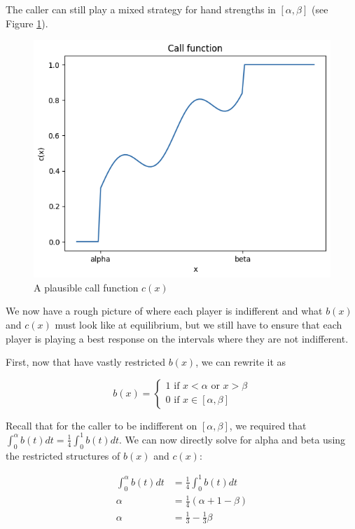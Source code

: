 \documentclass[a4paper,12pt]{article}
\begin{document}
The caller can still play a mixed strategy for hand strengths in $[ \alpha, \beta ]$ (see Figure \ref{call_function}). 

\begin{figure}
    \begin{center}
    \includegraphics*[scale=0.4]{../call_function.png}
    \caption{A plausible call function $c(x)$}
    \label{call_function}
    \end{center}
\end{figure}

We now have a rough picture of where each player is indifferent and what $b(x)$ and $c(x)$ must look like at equilibrium, but we still have to ensure that each player is playing a best response on the intervals where they are not indifferent. 

First, now that have vastly restricted $b(x)$, we can rewrite it as 

\[ b(x) = \begin{cases}
    1 \text{ if } x < \alpha \text{ or } x > \beta \\
    0 \text{ if } x \in [\alpha, \beta]
\end{cases} \]

Recall that for the caller to be indifferent on $[\alpha, \beta]$, we required that $\int_{0}^{\alpha} b(t) dt = \frac{1}{4} \int_{0}^{1} b(t) dt$. We can now directly solve for alpha and beta using the restricted structures of $b(x)$ and $c(x)$:

\begin{align*}
	\int_{0}^{\alpha} b(t) dt &= \frac{1}{4} \int_{0}^{1} b(t) dt\\
	\alpha &= \frac{1}{4} (\alpha + 1 - \beta)\\
    \alpha &= \frac{1}{3} - \frac{1}{3} \beta\\
\end{align*}
\end{document}
